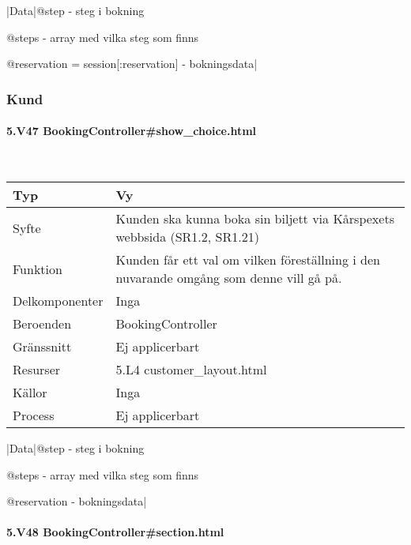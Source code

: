 \documentclass[a4paper, twoside, 11pt, titlepage]{article}
\begin{document}
			|Data|@step - steg i bokning

			@steps - array med vilka steg som finns

			@reservation = session[:reservation] - bokningsdata|

		\subsubsection{Kund}



			\paragraph{5.V47 BookingController\#show\_choice.html}\

			\begin {table} [ht] \begin{tabular} {  p{3.5cm} p{9.6cm} }
				\hline
				Typ & Vy  \\
				\hline
				Syfte & Kunden ska kunna boka sin biljett via Kårspexets webbsida (SR1.2, SR1.21)  \\
				\hline
				Funktion & Kunden får ett val om vilken föreställning i den nuvarande omgång som denne vill gå på.  \\
				\hline
				Delkomponenter & Inga  \\
				\hline
				Beroenden & BookingController  \\
				\hline
				Gränssnitt & Ej applicerbart  \\
				\hline
				Resurser & 5.L4 customer\_layout.html   \\
				\hline
				Källor & Inga  \\
				\hline
				Process & Ej applicerbart  \\
				\hline
			\end{tabular} \end{table} \FloatBarrier
			\vspace{6mm}

			|Data|@step - steg i bokning

			@steps - array med vilka steg som finns

			@reservation - bokningsdata|

			\paragraph{5.V48 BookingController\#section.html}\
\end{document}
